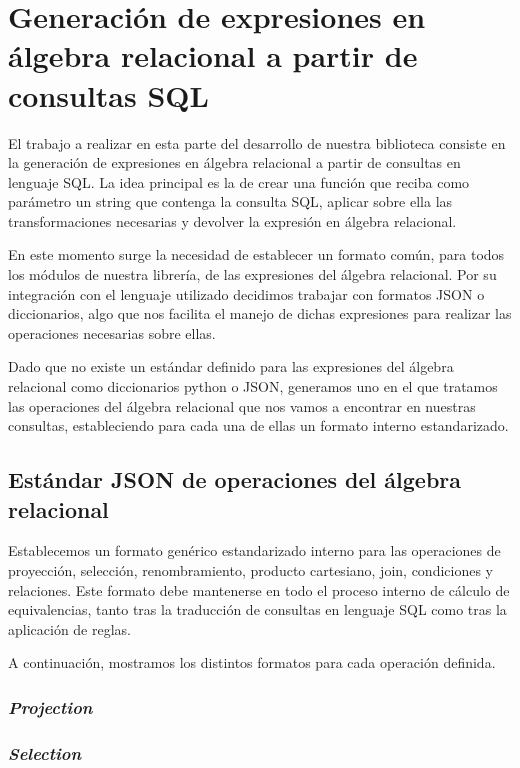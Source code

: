 \chapter{Generación de expresiones en álgebra relacional a partir de consultas SQL}
\noindent

El trabajo a realizar en esta parte del desarrollo de nuestra biblioteca consiste en la generación de expresiones en álgebra relacional a partir de consultas en lenguaje SQL. La idea principal es la de crear una función que reciba como parámetro un string que contenga la consulta SQL, aplicar sobre ella las transformaciones necesarias y devolver la expresión en álgebra relacional.

En este momento surge la necesidad de establecer un formato común, para todos los módulos de nuestra librería, de las expresiones del álgebra relacional. Por su integración con el lenguaje utilizado decidimos trabajar con formatos JSON o diccionarios, algo que nos facilita el manejo de dichas expresiones para realizar las operaciones necesarias sobre ellas.

Dado que no existe un estándar definido para las expresiones del álgebra relacional como diccionarios python o JSON, generamos uno en el que tratamos las operaciones del álgebra relacional que nos vamos a encontrar en nuestras consultas, estableciendo para cada una de ellas un formato interno estandarizado.

\section{Estándar JSON de operaciones del álgebra relacional}
Establecemos un formato genérico estandarizado interno para las operaciones de proyección, selección, renombramiento, producto cartesiano, join, condiciones y relaciones. Este formato debe mantenerse en todo el proceso interno de cálculo de equivalencias, tanto tras la traducción de consultas en lenguaje SQL como tras la aplicación de reglas.

A continuación, mostramos los distintos formatos para cada operación definida.
\subsection{\textit{Projection}}

\subsection{\textit{Selection}}

